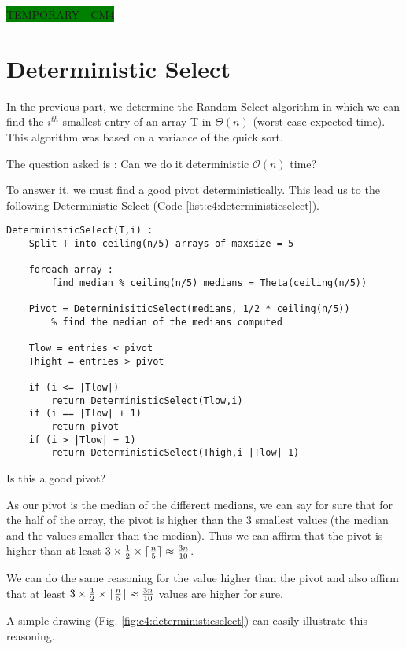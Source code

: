 \colorbox{green}{TEMPORARY - CM4}

\section{Deterministic Select}

In the previous part, we determine the Random Select algorithm in which we can find the $i^{th}$ smallest entry of an array T in $\Theta (n)$ (worst-case expected time). This algorithm was based on a variance of the quick sort.

The question asked is : Can we do it deterministic $\mathcal{O}(n)$ time?

To answer it, we must find a good pivot deterministically. This lead us to the following Deterministic Select (Code \ref{list:c4:deterministicselect}).

\begin{lstlisting}[label={list:c4:deterministicselect},caption=Pseudo-code of the Determinisic Select algorithm]
DeterministicSelect(T,i) :
    Split T into ceiling(n/5) arrays of maxsize = 5 
    
    foreach array : 
        find median % ceiling(n/5) medians = Theta(ceiling(n/5))
        
    Pivot = DeterminisiticSelect(medians, 1/2 * ceiling(n/5)) 
        % find the median of the medians computed
    
    Tlow = entries < pivot
    Thight = entries > pivot
    
    if (i <= |Tlow|)
        return DeterministicSelect(Tlow,i)
    if (i == |Tlow| + 1) 
        return pivot
    if (i > |Tlow| + 1)
        return DeterministicSelect(Thigh,i-|Tlow|-1)
\end{lstlisting}



Is this a good pivot?

As our pivot is the median of the different medians, we can say for sure that for the half of the array, the pivot is higher than the 3 smallest values (the median and the values smaller than the median). Thus we can affirm that the pivot is higher than at least $3\times \frac{1}{2} \times \lceil \frac{n}{5} \rceil \approx \frac{3n}{10}$.

We can do the same reasoning for the value higher than the pivot and also affirm that at least $3\times \frac{1}{2} \times \lceil \frac{n}{5} \rceil \approx \frac{3n}{10}$ values are higher for sure.

A simple drawing (Fig. \ref{fig:c4:deterministicselect}) can easily illustrate this reasoning.


